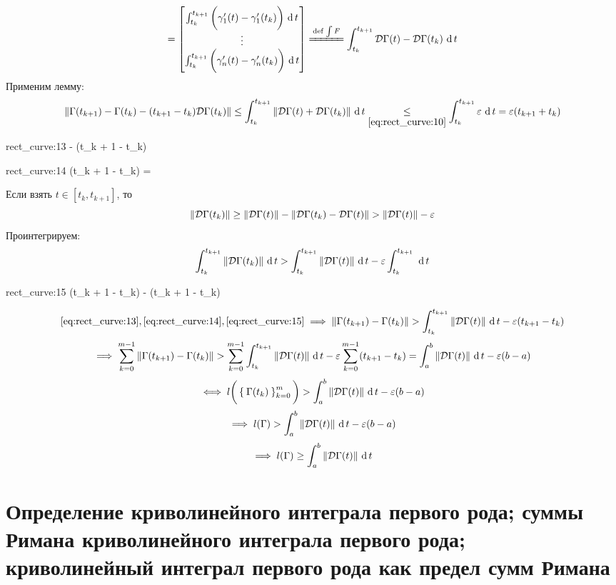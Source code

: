 \begin{iproof}
\begin{multline}
		= \column{\dint[t]{t_k}{t_{k + 1}}{ \bigg( \gamma_1'(t) - \gamma_1'(t_k) \bigg)}}{\dint[t]{t_k}{t_{k + 1}}{ \bigg( \gamma_n'(t) - \gamma_n'(t_k) \bigg)}} \bdefeq{\int F} \dint[t]{t_k}{t_{k + 1}}{\mc D\Gamma(t) - \mc D\Gamma(t_k)}
	\end{multline}
	Применим лемму:
	$$ \norm{\Gamma(t_{k + 1}) - \Gamma(t_k) - (t_{k + 1} - t_k)\mc D\Gamma(t_k)} \le \dint[t]{t_k}{t_{k + 1}}{\norm{\mc D\Gamma(t) + \mc D\Gamma(t_k)}} \underset{\eref{rect_curve:10}}\le \dint[t]{t_k}{t_{k + 1}}\veps = \veps(t_{k + 1} + t_k) $$
	\begin{equ}{rect_curve:13}
		\implies {} \trige {} - \veps (t_{k + 1} - t_k)
	\end{equ}
	\begin{equ}{rect_curve:14}
		(t_{k + 1} - t_k)  = 
	\end{equ}
	Если взять $ t \in [t_k, t_{k + 1}] $, то
	$$ \norm{\mc D \Gamma(t_k)} \ge \norm{\mc D\Gamma(t)} - \norm{\mc D\Gamma(t_k) - \mc D \Gamma(t)} > \norm{\mc D \Gamma(t)} - \veps $$
	Проинтегрируем:
	$$ \dint[t]{t_k}{t_{k + 1}}{\norm{\mc D\Gamma(t_k)}} > \dint[t]{t_k}{t_{k + 1}}{\norm{ \mc D\Gamma(t)}} - \veps \dint[t]{t_k}{t_{k + 1}}{} $$
	\begin{equ}{rect_curve:15}
		(t_{k + 1} - t_k)  \ge {} - \veps(t_{k + 1} - t_k)
	\end{equ}
	$$ \eref{rect_curve:13}, \eref{rect_curve:14}, \eref{rect_curve:15} \implies \norm{\Gamma(t_{k + 1}) - \Gamma(t_k)} > \dint[t]{t_k}{t_{k + 1}}{\norm{\mc D\Gamma(t)}} - \veps(t_{k + 1} - t_k) $$
	$$ \implies \sum_{k = 0}^{m - 1} \norm{\Gamma(t_{k + 1}) - \Gamma(t_k)} > \sum_{k = 0}^{m - 1} \dint[t]{t_k}{t_{k + 1}}{\norm{\mc D\Gamma(t)}} - \veps \sum_{k = 0}^{m - 1}(t_{k + 1} - t_k) = \dint[t]ab{\norm{\mc D\Gamma(t)}} - \veps(b - a) $$
	$$ \iff l \bigg( \seqz[m]{\Gamma(t_k)}k \bigg) > \dint[t]ab{\norm{\mc D\Gamma(t)}} - \veps(b - a) $$
	$$ \implies l(\Gamma) > \dint[t]ab{\norm{\mc D \Gamma(t)}} - \veps(b - a) $$
	$$ \implies l(\Gamma) \ge \dint[t]ab{\norm{\mc D \Gamma(t)}} $$
\end{iproof}

\section{Определение криволинейного интеграла первого рода; суммы Римана криволинейного интеграла первого рода; криволинейный интеграл первого рода как предел сумм Римана}

